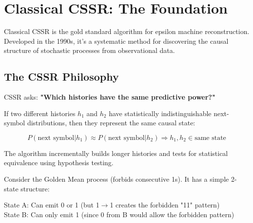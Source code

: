 \documentclass[11pt]{article}
\begin{document}
\section{Classical CSSR: The Foundation}

Classical CSSR is the gold standard algorithm for epsilon machine reconstruction. Developed in the 1990s, it's a systematic method for discovering the causal structure of stochastic processes from observational data.

\subsection{The CSSR Philosophy}

\begin{notebox}
CSSR asks: \textbf{"Which histories have the same predictive power?"}

If two different histories $h_1$ and $h_2$ have statistically indistinguishable next-symbol distributions, then they represent the same causal state:

$$P(\text{next symbol} | h_1) \approx P(\text{next symbol} | h_2) \Rightarrow h_1, h_2 \in \text{same state}$$

The algorithm incrementally builds longer histories and tests for statistical equivalence using hypothesis testing.
\end{notebox}

\begin{notebox}
Consider the Golden Mean process (forbids consecutive 1s). It has a simple 2-state structure:

\begin{center}
\end{center}

State A: Can emit 0 or 1 (but 1$\rightarrow$1 creates the forbidden "11" pattern) \\
State B: Can only emit 1 (since 0 from B would allow the forbidden pattern)
\end{notebox}
\end{document}
